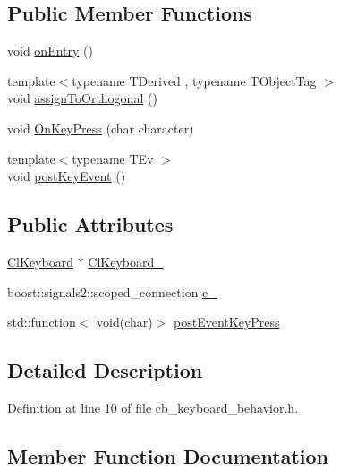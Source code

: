 \subsection*{Public Member Functions}
\begin{DoxyCompactItemize}
\item 
void \hyperlink{classsm__three__some_1_1CbKeyboard_af5fe2932db5f471afa125cae35362ba7}{on\+Entry} ()
\item 
{\footnotesize template$<$typename T\+Derived , typename T\+Object\+Tag $>$ }\\void \hyperlink{classsm__three__some_1_1CbKeyboard_ab8f25de5cc879e4459e896a2a47917fe}{assign\+To\+Orthogonal} ()
\item 
void \hyperlink{classsm__three__some_1_1CbKeyboard_a28bdbe8a69cabc44933f601061331cbf}{On\+Key\+Press} (char character)
\item 
{\footnotesize template$<$typename T\+Ev $>$ }\\void \hyperlink{classsm__three__some_1_1CbKeyboard_a02cbcf0db3b509c78b545e9f1d3ef313}{post\+Key\+Event} ()
\end{DoxyCompactItemize}
\subsection*{Public Attributes}
\begin{DoxyCompactItemize}
\item 
\hyperlink{classsm__three__some_1_1ClKeyboard}{Cl\+Keyboard} $\ast$ \hyperlink{classsm__three__some_1_1CbKeyboard_adbbfdbe9e4dc267a55e85f19683131fc}{Cl\+Keyboard\+\_\+}
\item 
boost\+::signals2\+::scoped\+\_\+connection \hyperlink{classsm__three__some_1_1CbKeyboard_a6b6a885c39f32f29e907cfbc37b08b6f}{c\+\_\+}
\item 
std\+::function$<$ void(char)$>$ \hyperlink{classsm__three__some_1_1CbKeyboard_a746c413234e920c55625d63f4a6be784}{post\+Event\+Key\+Press}
\end{DoxyCompactItemize}


\subsection{Detailed Description}


Definition at line 10 of file cb\+\_\+keyboard\+\_\+behavior.\+h.



\subsection{Member Function Documentation}
